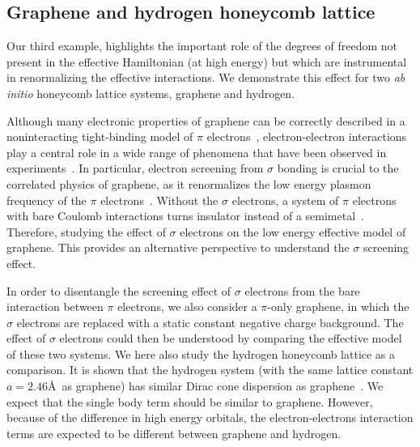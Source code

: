 \subsection{Graphene and hydrogen honeycomb lattice}
Our third example, highlights the important role of the degrees of freedom 
not present in the effective Hamiltonian (at high energy) but which are instrumental 
in renormalizing the effective interactions. We demonstrate this effect for two \textit{ab initio} 
honeycomb lattice systems, graphene and hydrogen. 

Although many electronic properties of graphene can be correctly described in a noninteracting tight-binding model 
of $\pi$ electrons~\cite{Castro2009}, electron-electron interactions play a central role in a wide range of phenomena 
that have been observed in experiments~\cite{Kotov2012}. In particular, electron screening from $\sigma$ bonding is 
crucial to the correlated physics of graphene, as it renormalizes the low energy plasmon frequency of 
the $\pi$ electrons~\cite{Zheng2016}. Without the $\sigma$ electrons, a system of $\pi$ electrons with bare Coulomb interactions 
turns  insulator instead of a semimetal~\cite{DrutPRL2009, DrutPRB2009,  Smith2014, Zheng2016}. Therefore, studying the effect of $\sigma$ electrons on the low energy effective model of graphene. This provides an alternative perspective to understand the $\sigma$ screening effect. 

In order to disentangle the screening effect of $\sigma$ electrons from the bare interaction between $\pi$ electrons, we also consider a $\pi$-only graphene, in which the $\sigma$ electrons are replaced with a static constant negative charge background. The effect of $\sigma$ electrons could then be understood by comparing the effective model of these two systems. 
We here also study the hydrogen honeycomb lattice as a comparison. It is shown that the hydrogen system (with the same lattice constant $a=2.46$\AA~as graphene) has similar Dirac cone dispersion as graphene~\cite{Zheng2016}. We expect that the single body term should be similar to graphene. However, because of the difference in high energy orbitals, the electron-electrons interaction terms are expected to be different between graphene and hydrogen. 

